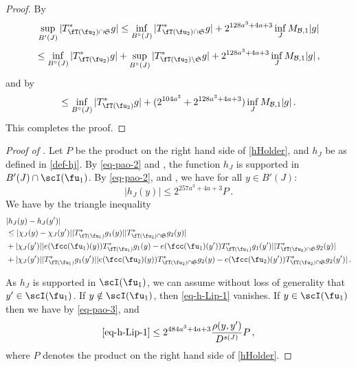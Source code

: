     \begin{proof}
        \leanok
        By 
        $$
            \sup_{B'(J)} |T^*_{\fT(\fu_2) \cap \mathfrak{S}} g| \le \inf_{B^\circ{}(J)} |T_{\fT(\fu_2) \cap \mathfrak{S}}^* g| + 2^{128a^3+4a+3} \inf_{J} M_{\mathcal{B}, 1} |g|
        $$
        $$
            \le \inf_{B^\circ{}(J)} |T_{\fT(\fu_2)}^* g| + \sup_{B^\circ{}(J)} |T_{\fT(\fu_2) \setminus \mathfrak{S}}^* g| + 2^{128a^3+4a+3} \inf_{J} M_{\mathcal{B}, 1} |g|\,,
        $$
        and by 
        $$
            \le \inf_{B^\circ{}(J)} |T_{\fT(\fu_2)}^* g| + (2^{104a^3} + 2^{128a^3+4a+3}) \inf_{J} M_{\mathcal{B}, 1} |g|\,.
        $$
        This completes the proof.
    \end{proof}

    \begin{proof}[Proof of ]
        \leanok
        Let $P$ be the product on the right hand side of \eqref{hHolder}, and $h_J$ be as defined in \eqref{def-hj}.
        By \eqref{eq-pao-2} and , the function $h_J$ is supported in $B'(J) \cap \scI(\fu_1)$.
        By \eqref{eq-pao-2},  and , we have for all $y \in B'(J)$:
        $$
            |h_J(y)| \le 2^{257a^3+4a+3} P\,.
        $$
        We have by the triangle inequality
        \begin{align}
            &|h_J(y) - h_J(y')|\nonumber\\
            \label{eq-h-Lip-1}
            &\le |\chi_J(y) - \chi_J(y')| |T_{\fT(\fu_1)}^* g_1(y)| |T_{\fT(\fu_2) \cap \mathfrak{S}}^* g_2(y)|\\
            \label{eq-h-Lip-2}
            & + |\chi_J(y')| |e(\fcc(\fu_1)(y)) T_{\fT(\fu_1)}^* g_1(y) - e(\fcc(\fu_1)(y')) T_{\fT(\fu_1)}^* g_1(y')| |T_{\fT(\fu_2) \cap \mathfrak{S}}^* g_2(y)|\\
            \label{eq-h-Lip-3}
            & + |\chi_J(y')| |T_{\fT(\fu_1)}^* g_1(y')| |e(\fcc(\fu_2)(y)) T_{\fT(\fu_2) \cap \mathfrak{S}}^* g_2(y) - e(\fcc(\fu_2)(y')) T_{\fT(\fu_2) \cap \mathfrak{S}}^* g_2(y')|\,.
        \end{align}

        As $h_J$ is supported in $\scI(\fu_1)$, we can assume without loss of generality that $y' \in \scI(\fu_1)$.
        If $y \notin \scI(\fu_1)$, then \eqref{eq-h-Lip-1} vanishes. If $y \in \scI(\fu_1)$ then we have by \eqref{eq-pao-3},  and 
        $$
            \eqref{eq-h-Lip-1} \le 2^{484a^3+4a+3} \frac{\rho(y,y')}{D^{s(J)}} P\,,
        $$
        where $P$ denotes the product on the right hand side of \eqref{hHolder}.


\end{proof}
